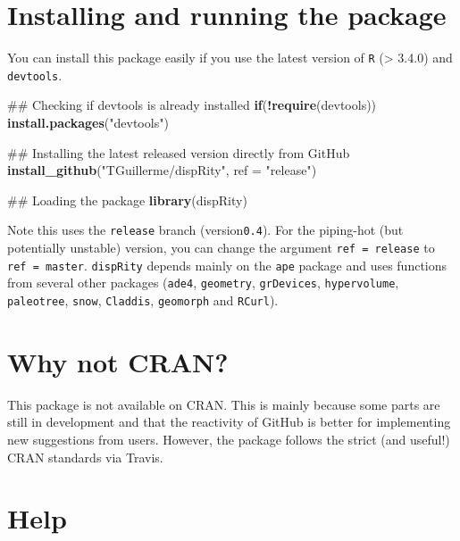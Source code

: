 \documentclass[]{book}
\newenvironment{Shaded}{\begin{snugshade}}{\end{snugshade}}
\newcommand{\KeywordTok}[1]{\textcolor[rgb]{0.13,0.29,0.53}{\textbf{#1}}}
\newcommand{\DataTypeTok}[1]{\textcolor[rgb]{0.13,0.29,0.53}{#1}}
\newcommand{\StringTok}[1]{\textcolor[rgb]{0.31,0.60,0.02}{#1}}
\newcommand{\ControlFlowTok}[1]{\textcolor[rgb]{0.13,0.29,0.53}{\textbf{#1}}}
\newcommand{\OperatorTok}[1]{\textcolor[rgb]{0.81,0.36,0.00}{\textbf{#1}}}
\newcommand{\NormalTok}[1]{#1}
\theoremstyle{definition}
\theoremstyle{definition}
\theoremstyle{remark}
\begin{document}
\section{Installing and running the
package}\label{installing-and-running-the-package}

You can install this package easily if you use the latest version of
\texttt{R} (\textgreater{} 3.4.0) and \texttt{devtools}.

\begin{Shaded}
\begin{Highlighting}[]
\NormalTok{## Checking if devtools is already installed}
\ControlFlowTok{if}\NormalTok{(}\OperatorTok{!}\KeywordTok{require}\NormalTok{(devtools)) }\KeywordTok{install.packages}\NormalTok{(}\StringTok{"devtools"}\NormalTok{)}

\NormalTok{## Installing the latest released version directly from GitHub}
\KeywordTok{install_github}\NormalTok{(}\StringTok{"TGuillerme/dispRity"}\NormalTok{, }\DataTypeTok{ref =} \StringTok{"release"}\NormalTok{)}

\NormalTok{## Loading the package}
\KeywordTok{library}\NormalTok{(dispRity)}
\end{Highlighting}
\end{Shaded}

Note this uses the \texttt{release} branch (version\texttt{0.4}). For
the piping-hot (but potentially unstable) version, you can change the
argument \texttt{ref\ =\ release} to \texttt{ref\ =\ master}.
\texttt{dispRity} depends mainly on the \texttt{ape} package and uses
functions from several other packages (\texttt{ade4}, \texttt{geometry},
\texttt{grDevices}, \texttt{hypervolume}, \texttt{paleotree},
\texttt{snow}, \texttt{Claddis}, \texttt{geomorph} and \texttt{RCurl}).

\section{Why not CRAN?}\label{why-not-cran}

This package is not available on CRAN. This is mainly because some parts
are still in development and that the reactivity of GitHub is better for
implementing new suggestions from users. However, the package follows
the strict (and useful!) CRAN standards via Travis.

\section{Help}\label{help}
\end{document}
